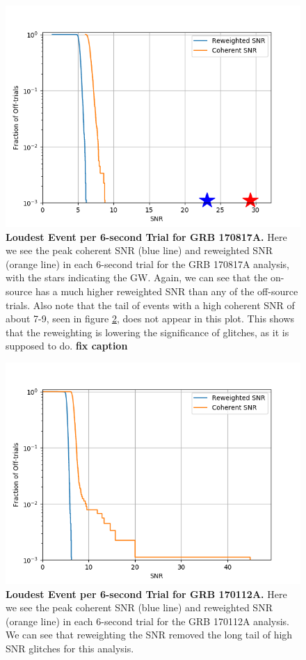 \documentclass[11pt]{cuthesis}
\begin{document}
\begin{figure} %
\begin{center}
\includegraphics[width=0.8\linewidth]{binned_fap_with_signal_170817.png}
\end{center}
\caption{\textbf{Loudest Event per 6-second Trial for GRB 170817A.}  Here we see the peak coherent SNR (blue line) and reweighted SNR (orange line) in each 6-second trial for the GRB 170817A analysis, with the stars indicating the GW. Again, we can see that the on-source has a much higher reweighted SNR than any of the off-source trials. Also note that the tail of events with a high coherent SNR of about 7-9, seen in figure \ref{fig:coh off trials 170817}, does not appear in this plot. This shows that the reweighting is lowering the significance of glitches, as it is supposed to do. \textbf{fix caption}} 
\label{fig:re off trials 170817}
\end{figure}

\begin{figure} %
\begin{center}
\includegraphics[width=0.8\linewidth]{binned_fap_with_signal_GRB170112A.png}
\end{center}
\caption{\textbf{Loudest Event per 6-second Trial for GRB 170112A.} Here we see the peak coherent SNR (blue line) and reweighted SNR (orange line) in each 6-second trial for the GRB 170112A analysis. We can see that reweighting the SNR removed the long tail of high SNR glitches for this analysis. } 
\label{fig:coh off trials 170817}
\end{figure}
\end{document}
